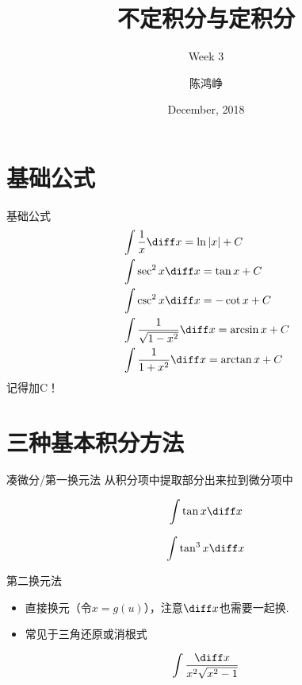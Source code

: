 \documentclass{myslide}
\title{不定积分与定积分}
\subtitle{Week 3}
\author[chhzh123]{陈鸿峥}
\institute[]{\small\url{https://github.com/chhzh123/Notes-of-Math/blob/master/Mathematical_analysis/main.pdf}}
\date[Dec, 2018]{December, 2018}
\begin{document}
\begin{frame}
\titlepage
\end{frame}

\begin{frame}
\tableofcontents[subsectionstyle=show]
\end{frame}

\section{基础公式}
\begin{frame}
\sectionpage
\end{frame}

\begin{frame}{基础公式}
\[\begin{aligned}
&\int\frac{1}{x}\diff x=\ln|x|+C\\
&\int\sec^2x\diff x=\tan x+C\\
&\int\csc^2x\diff x=-\cot x+C\\
&\int\frac{1}{\sqrt{1-x^2}}\diff x=\arcsin x+C\\
&\int\frac{1}{1+x^2}\diff x=\arctan x+C
\end{aligned}\]
记得加C！
\end{frame}

\section{三种基本积分方法}
\begin{frame}
\sectionpage
\end{frame}

\begin{frame}{凑微分/第一换元法}
从积分项中提取部分出来拉到微分项中
\begin{example}
\[\int\tan x\diff x\]
\end{example}
\begin{exercise}
\[\int \tan^3 x\diff x\]
\end{exercise}
\end{frame}

\begin{frame}{第二换元法}
\begin{itemize}
	\item 直接换元（令$x=g(u)$），注意$\diff x$也需要一起换.
	\item 常见于三角还原或消根式
\end{itemize}
\begin{example}[\textsection 6.2/例12]
\[\int\frac{\diff x}{x^2\sqrt{x^2-1}}\]
\end{example}
\end{frame}
\end{document}
